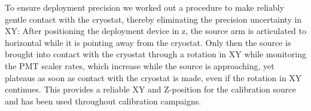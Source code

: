 To ensure deployment precision we worked out a procedure to make reliably gentle contact with the cryostat, thereby eliminating the precision uncertainty in XY: After positioning the deployment device in z, the source arm is articulated to horizontal while it is pointing away from the cryostat. Only then the source is brought into contact with the cryostat through a rotation in XY while monitoring the PMT scaler rates, which increase while the source is approaching, yet plateaus as soon as contact with the cryostat is made, even if the rotation in XY continues. This provides a reliable XY and Z-position for the calibration source and has been used throughout calibration campaigns.
